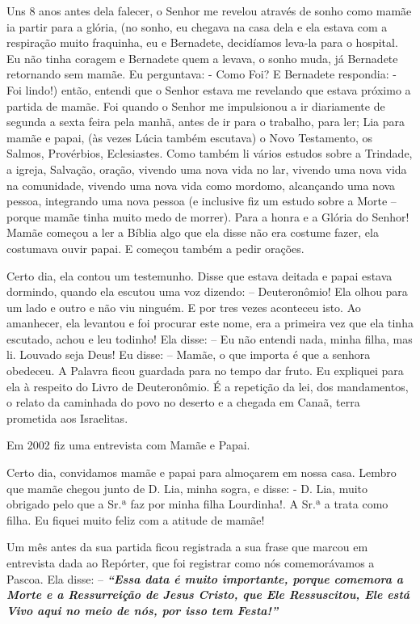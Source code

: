 \documentclass[
  brazil,
  a6paper,
  oneside,
  landscape,
  14pt]{scrbook}
\begin{document}
Uns 8 anos antes dela falecer, o Senhor me revelou através de sonho como
mamãe ia partir para a glória, (no sonho, eu chegava na casa dela e ela
estava com a respiração muito fraquinha, eu e Bernadete, decidíamos
leva-la para o hospital. Eu não tinha coragem e Bernadete quem a levava,
o sonho muda, já Bernadete retornando sem mamãe. Eu perguntava: - Como
Foi? E Bernadete respondia: - Foi lindo!) então, entendi que o Senhor
estava me revelando que estava próximo a partida de mamãe. Foi quando o
Senhor me impulsionou a ir diariamente de segunda a sexta feira pela
manhã, antes de ir para o trabalho, para ler; Lia para mamãe e papai,
(às vezes Lúcia também escutava) o Novo Testamento, os Salmos,
Provérbios, Eclesiastes. Como também li vários estudos sobre a Trindade,
a igreja, Salvação, oração, vivendo uma nova vida no lar, vivendo uma
nova vida na comunidade, vivendo uma nova vida como mordomo, alcançando
uma nova pessoa, integrando uma nova pessoa (e inclusive fiz um estudo
sobre a Morte -- porque mamãe tinha muito medo de morrer). Para a honra
e a Glória do Senhor! Mamãe começou a ler a Bíblia algo que ela disse
não era costume fazer, ela costumava ouvir papai. E começou também a
pedir orações.

Certo dia, ela contou um testemunho. Disse que estava deitada e papai
estava dormindo, quando ela escutou uma voz dizendo: -- Deuteronômio!
Ela olhou para um lado e outro e não viu ninguém. E por tres vezes
aconteceu isto. Ao amanhecer, ela levantou e foi procurar este nome, era
a primeira vez que ela tinha escutado, achou e leu todinho! Ela disse:
-- Eu não entendi nada, minha filha, mas li. Louvado seja Deus! Eu
disse: -- Mamãe, o que importa é que a senhora obedeceu. A Palavra ficou
guardada para no tempo dar fruto. Eu expliquei para ela à respeito do
Livro de Deuteronômio. É a repetição da lei, dos mandamentos, o relato
da caminhada do povo no deserto e a chegada em Canaã, terra prometida
aos Israelitas.

Em 2002 fiz uma entrevista com Mamãe e Papai.

Certo dia, convidamos mamãe e papai para almoçarem em nossa casa. Lembro
que mamãe chegou junto de D. Lia, minha sogra, e disse: - D. Lia, muito
obrigado pelo que a Sr.ª faz por minha filha Lourdinha!. A Sr.ª a trata
como filha. Eu fiquei muito feliz com a atitude de mamãe!

Um mês antes da sua partida ficou registrada a sua frase que marcou em
entrevista dada ao Repórter, que foi registrar como nós comemorávamos a
Pascoa. Ela disse: -- \textbf{\emph{``Essa data é muito importante,
porque comemora a Morte e a Ressurreição de Jesus Cristo, que Ele
Ressuscitou, Ele está Vivo aqui no meio de nós, por isso tem Festa!''}}
\end{document}
